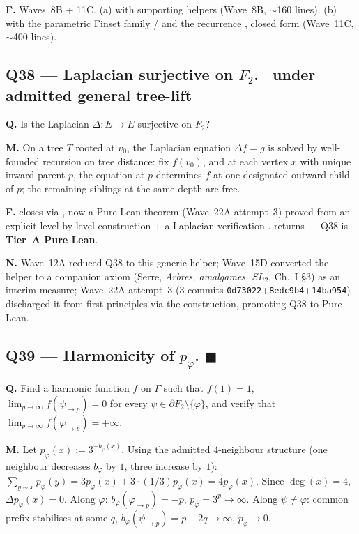 \documentclass[11pt,a4paper]{article}
\newcommand{\done}[1]{\textcolor{donegreen}{\textbf{#1}}}
\newcommand{\todoc}[1]{\textcolor{todoamber}{\textbf{#1}}}
\newcommand{\cmd}[1]{\texttt{\small #1}}
\renewcommand{\deg}{\operatorname{deg}}
\theoremstyle{plain}
\theoremstyle{definition}
\begin{document}
\textbf{F.} Waves~8B + 11C. (a) 
with supporting  helpers (Wave~8B, $\sim$160 lines).
(b)  with the parametric
Finset family / and the recurrence
, closed form 
(Wave~11C, $\sim$400 lines).

\subsection{Q38 --- Laplacian surjective on $F_2$. \todoc{\textopenbullet}{\normalfont\ under admitted general tree-lift}}

\textbf{Q.} Is the Laplacian $\Delta : E \to E$ surjective on
$F_2$?

\textbf{M.} On a tree $T$ rooted at $v_0$, the Laplacian equation
$\Delta f = g$ is solved by well-founded recursion on tree distance:
fix $f(v_0)$, and at each vertex $x$ with unique inward parent $p$,
the equation at $p$ determines $f$ at one designated outward child
of $p$; the remaining siblings at the same depth are free.

\textbf{F.}  closes via
, now a Pure-Lean theorem (Wave~22A
attempt~3) proved from an explicit level-by-level construction
 + a Laplacian verification .
 returns
 --- Q38 is
\textbf{Tier~A Pure Lean}.

\textbf{N.} Wave~12A reduced Q38 to this generic helper; Wave~15D
converted the helper to a companion axiom (Serre, \emph{Arbres,
amalgames, $SL_2$}, Ch.~I §3) as an interim measure; Wave~22A
attempt~3 (3 commits \cmd{0d73022}+\cmd{8edc9b4}+\cmd{14ba954})
discharged it from first principles via the 
construction, promoting Q38 to Pure Lean.

\subsection{Q39 --- Harmonicity of $p_\varphi$. \done{$\blacksquare$}}

\textbf{Q.} Find a harmonic function $f$ on $\Gamma$ such that
$f(1) = 1$, $\lim_{p \to \infty} f(\psi_{\to p}) = 0$ for every
$\psi \in \partial F_2 \setminus \{\varphi\}$, and verify that
$\lim_{p \to \infty} f(\varphi_{\to p}) = +\infty$.

\textbf{M.} Let $p_\varphi(x) := 3^{-b_\varphi(x)}$. Using the
admitted 4-neighbour structure (one neighbour decreases $b_\varphi$
by $1$, three increase by $1$):
$\sum_{y \sim x} p_\varphi(y) = 3 p_\varphi(x) + 3 \cdot (1/3)
p_\varphi(x) = 4 p_\varphi(x)$. Since $\deg(x) = 4$, $\Delta
p_\varphi(x) = 0$.
Along $\varphi$: $b_\varphi(\varphi_{\to p}) = -p$, $p_\varphi = 3^p
\to \infty$. Along $\psi \neq \varphi$: common prefix stabilises
at some $q$, $b_\varphi(\psi_{\to p}) = p - 2q \to \infty$,
$p_\varphi \to 0$.
\end{document}
